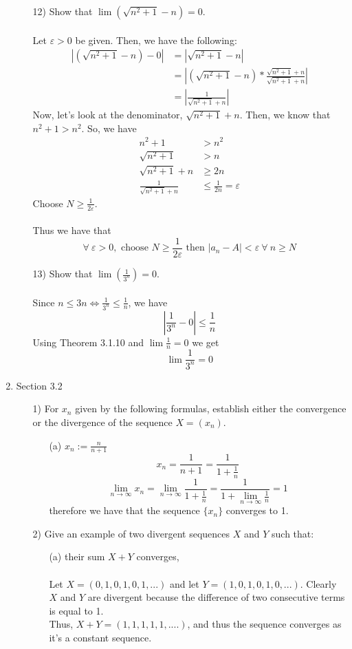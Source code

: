 \documentclass[12pt,letterpaper]{article}
\newcommand{\abs}[1]{\left\lvert #1 \right\rvert}
\theoremstyle{case}
\begin{document}
\begin{enumerate}
\begin{enumerate}
			\item[12)] Show that $\lim (\sqrt{n^2+1}-n)=0$.
			\\\\Let $\varepsilon > 0$ be given. Then, we have the following:
			\begin{align*}
				\abs{(\sqrt{n^2+1}-n)-0} &= \abs{\sqrt{n^2+1}-n}
				\\ &= \abs{(\sqrt{n^2+1}-n)*\frac{\sqrt{n^2+1}+n}{\sqrt{n^2+1}+n}}
				\\ &= \abs{\frac{1}{\sqrt{n^2+1}+n}}
			\end{align*}
			Now, let's look at the denominator, $\sqrt{n^2+1}+n$. Then, we know that $n^2+1 > n^2$. So, we have 
			\begin{align*}
				n^2+1 &> n^2
				\\ \sqrt{n^2+1}&> n
				\\ \sqrt{n^2+1}+n &\geq 2n
				\\ \frac{1}{\sqrt{n^2 + 1}+n} &\leq \frac{1}{2n} = \varepsilon
			\end{align*}
			Choose $N \geq \frac{1}{2\varepsilon}$.
			\\\\Thus we have that
			\[\forall\ \varepsilon > 0, \text{ choose } N \geq \frac{1}{2\varepsilon} \text{ then }\abs{a_n-A} < \varepsilon\ \forall\ n \geq N\]
			
			\item[13)] Show that $\lim (\frac{1}{3^n})=0$.
			\\\\Since $n \leq 3n \iff \frac{1}{3^n} \leq \frac{1}{n}$, we have 
			\[\abs{\frac{1}{3^n}-0}\leq \frac{1}{n}\]
			Using Theorem 3.1.10 and $\lim \frac{1}{n}=0$ we get
			\[\lim \frac{1}{3^n}=0\]
		\end{enumerate}
		\item Section 3.2
		\begin{enumerate}
			\item[1)] For $x_n$ given by the following formulas, establish either the convergence or the divergence of the sequence $X = (x_n)$.
			
			\begin{enumerate}
				\item[(a)] $x_n := \frac{n}{n+1}$
				\[x_n=\frac{1}{n+1}=\frac{1}{1+\frac{1}{n}}\]
				\[\lim_{n\to\infty}x_n=\lim_{n\to\infty} \frac{1}{1+\frac{1}{n}}=\frac{1}{1+\lim_{n\to\infty}\frac{1}{n}}=1\]
				therefore we have that the sequence $\{x_n\}$ converges to 1.
			\end{enumerate}
			\item[2)] Give an example of two divergent sequences $X$ and $Y$ such that:
			\begin{enumerate}
				\item[(a)] their sum $X + Y$ converges,
				\\\\Let $X=(0,1,0,1,0,1,...)$ and let $Y=(1,0,1,0,1,0,...)$. Clearly $X$ and $Y$ are divergent because the difference of two consecutive terms is equal to 1.
				\\Thus, $X+Y=(1,1,1,1,1,....)$, and thus the sequence converges as it's a constant sequence.
				

\end{enumerate}
\end{enumerate}
\end{enumerate}
\end{document}
